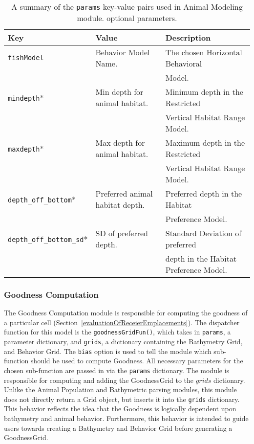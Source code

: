 \begin{table}[ht]
	\begin{tabular}{l l l}
		Key									&	Value 							&	Description\\
		\hline
		\texttt{fishModel}					& 	Behavior Model Name.			&	The chosen Horizontal Behavioral\\
					 						&									&    Model.\\
		\texttt{mindepth}*					& 	Min depth for animal habitat.	&	Minimum depth in the Restricted\\
					 						&									&   Vertical Habitat Range Model.\\
		\texttt{maxdepth}*					& 	Max depth for animal habitat.	&	Maximum depth in the Restricted\\
					 						&									&   Vertical Habitat Range Model.\\
		\texttt{depth\_off\_bottom}*		& 	Preferred animal habitat depth.	&   Preferred depth in the Habitat\\
					 						&									&   Preference Model.\\
		\texttt{depth\_off\_bottom\_sd}*	& 	SD of preferred depth.			&   Standard Deviation of preferred\\
					 						&									&   depth in the Habitat Preference Model.\\
	\end{tabular}
	\caption{A summary of the \texttt{params} key-value pairs used in Animal Modeling module.  \newline * optional parameters.
		\label{animalParams}}
\end{table}

\subsubsection{Goodness Computation}
The Goodness Computation module is responsible for computing the goodness of a particular cell (Section~\ref{evaluationOfReceierEmplacements}).  The dispatcher function for this model is the \texttt{goodnessGridFun()}, which takes in \texttt{params}, a parameter dictionary, and \texttt{grids}, a dictionary containing the Bathymetry Grid, and Behavior Grid.  The \texttt{bias} option is used to tell the module which sub-function should be used to compute Goodness.  All necessary parameters for the chosen sub-function are passed in via the \texttt{params} dictionary.  The module is responsible for computing and adding the GoodnessGrid to the $grids$ dictionary.  Unlike the Animal Population and Bathymetric parsing modules, this module does not directly return a Grid object, but inserts it into the \texttt{grids} dictionary.  This behavior reflects the idea that the Goodness is logically dependent upon bathymetry and animal behavior.  Furthermore, this behavior is intended to guide users towards creating a Bathymetry and Behavior Grid before generating a GoodnessGrid.

